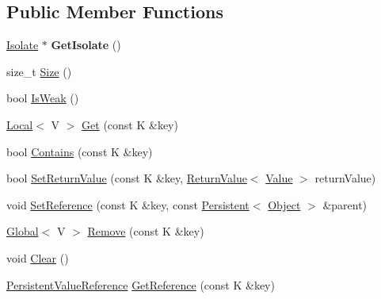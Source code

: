 \subsection*{Public Member Functions}
\begin{DoxyCompactItemize}
\item 
\hypertarget{classv8_1_1PersistentValueMapBase_a80da7adc6e8bdb166912075346116978}{}\hyperlink{classv8_1_1Isolate}{Isolate} $\ast$ {\bfseries Get\+Isolate} ()\label{classv8_1_1PersistentValueMapBase_a80da7adc6e8bdb166912075346116978}

\item 
size\+\_\+t \hyperlink{classv8_1_1PersistentValueMapBase_ade5c5db2a968fdabe073649e85b837eb}{Size} ()
\item 
bool \hyperlink{classv8_1_1PersistentValueMapBase_a9f824b13dd30605589508db2740dd678}{Is\+Weak} ()
\item 
\hyperlink{classv8_1_1Local}{Local}$<$ V $>$ \hyperlink{classv8_1_1PersistentValueMapBase_a16b8f906ea42036c2f37d44813bf2a72}{Get} (const K \&key)
\item 
bool \hyperlink{classv8_1_1PersistentValueMapBase_a8c68e5f99c4042541c6d32232c97282a}{Contains} (const K \&key)
\item 
bool \hyperlink{classv8_1_1PersistentValueMapBase_a85201649d2bbd0ffdebe8be3d5c6447a}{Set\+Return\+Value} (const K \&key, \hyperlink{classv8_1_1ReturnValue}{Return\+Value}$<$ \hyperlink{classv8_1_1Value}{Value} $>$ return\+Value)
\item 
void \hyperlink{classv8_1_1PersistentValueMapBase_a6fa5f720b283dd9fa626a67e7687dcd0}{Set\+Reference} (const K \&key, const \hyperlink{classv8_1_1Persistent}{Persistent}$<$ \hyperlink{classv8_1_1Object}{Object} $>$ \&parent)
\item 
\hyperlink{classv8_1_1Global}{Global}$<$ V $>$ \hyperlink{classv8_1_1PersistentValueMapBase_abd75a4c050416712167ba0bb9eace097}{Remove} (const K \&key)
\item 
void \hyperlink{classv8_1_1PersistentValueMapBase_a1bf074e7a7c24713c9a3d40ddce89e74}{Clear} ()
\item 
\hyperlink{classv8_1_1PersistentValueMapBase_1_1PersistentValueReference}{Persistent\+Value\+Reference} \hyperlink{classv8_1_1PersistentValueMapBase_a52e74c69b94c7ce77a65af9f32d68af4}{Get\+Reference} (const K \&key)
\end{DoxyCompactItemize}
